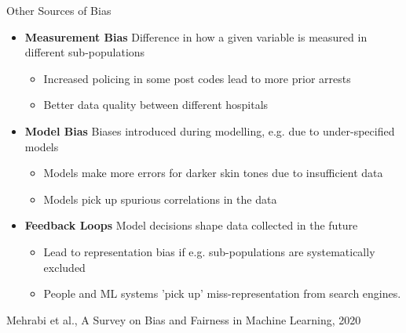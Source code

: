 \documentclass[11pt,compress,t,notes=noshow, xcolor=table]{beamer}
\begin{document}
\begin{vbframe}{Other Sources of Bias}
    \footnotesize

    \begin{itemize}
        \item \textbf{Measurement Bias} Difference in how a given variable is measured in different sub-populations
        \begin{itemize}
            \footnotesize
            \item Increased policing in some post codes lead to more prior arrests
            \item Better data quality between different hospitals
        \end{itemize}
        
        \item \textbf{Model Bias} Biases introduced during modelling, e.g. due to under-specified models
        \begin{itemize}
            \footnotesize
            \item Models make more errors for darker skin tones due to insufficient data
            \item Models pick up spurious correlations in the data
        \end{itemize}
        
        \item \textbf{Feedback Loops} Model decisions shape data collected in the future
        \begin{itemize}
            \footnotesize
            \item Lead to representation bias if e.g. sub-populations are systematically excluded
            \item People and ML systems 'pick up' miss-representation from search engines. 
        \end{itemize}
    \end{itemize}

    \vfill
    \tiny{Mehrabi et al., A Survey on Bias and Fairness in Machine Learning, 2020}
\end{vbframe}
\end{document}
